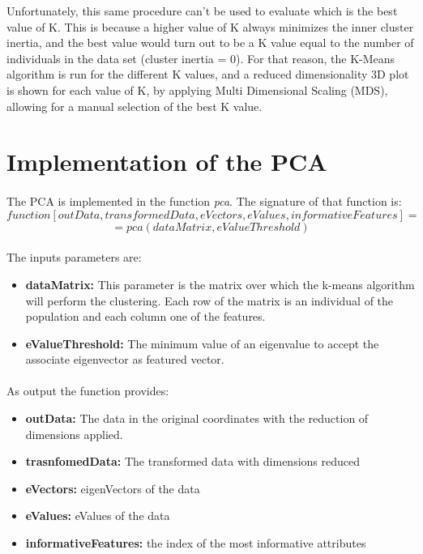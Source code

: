 \documentclass[12pt, a4paper]{article}
\begin{document}
Unfortunately, this same procedure can't be used to evaluate which is the best value of K. This is because a higher value of K always minimizes the inner cluster inertia, and the best value would turn out to be a K value equal to the number of individuals in the data set (cluster inertia = 0). For that reason, the K-Means algorithm is run for the different K values, and a reduced dimensionality 3D plot is shown for each value of K, by applying Multi Dimensional Scaling (MDS), allowing for a manual selection of the best K value.

\section{Implementation of the PCA} %
\label{sec:implementation_of_the_pca}
\paragraph{}The PCA is implemented in the function \emph{pca}. The signature of that function is:
\[
	function [ outData, transformedData, eVectors, eValues, informativeFeatures] =
\]
\[
	=pca( dataMatrix, eValueThreshold)
\]
\paragraph{}The inputs parameters are:
\begin{itemize}
	\item \textbf{dataMatrix:} This parameter is the matrix over which the k-means algorithm will perform the clustering. Each row of the matrix is an individual of the population and each column one of the features.
	\item \textbf{eValueThreshold:} The minimum value of an eigenvalue to accept the associate eigenvector as featured vector.
\end{itemize}
\paragraph{}As output the function provides:
\begin{itemize}
	\item \textbf{outData:} The data in the original coordinates with the reduction of dimensions applied.
	\item \textbf{trasnfomedData:} The transformed data with dimensions reduced
	\item \textbf{eVectors:} eigenVectors of the data
	\item \textbf{eValues:} eValues of the data
	\item \textbf{informativeFeatures:} the index of the most informative attributes
\end{itemize}
\end{document}
